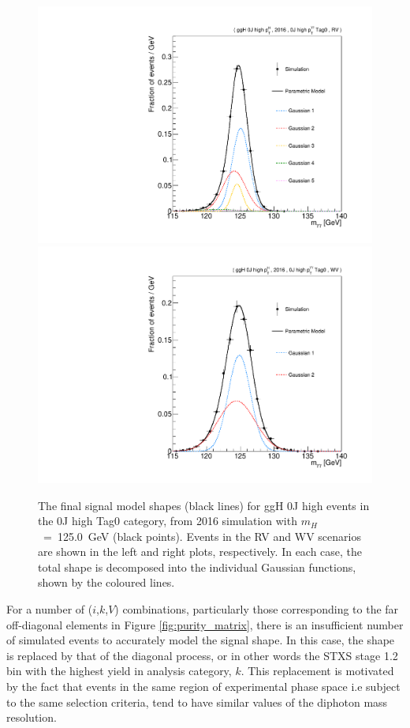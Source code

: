 \begin{figure}
  \centering
  \includegraphics[width=.49\textwidth]{Figures/hgg_stats/RV_shape_pdf_components_GG2H_0J_PTH_GT10_RECO_0J_PTH_GT10_Tag0.pdf}
  \hfill
  \includegraphics[width=.49\textwidth]{Figures/hgg_stats/WV_shape_pdf_components_GG2H_0J_PTH_GT10_RECO_0J_PTH_GT10_Tag0.pdf}
  \caption[Signal modelling: components]
  {
    The final signal model shapes (black lines) for ggH 0J high \ptH events in the 0J high \ptgg Tag0 category, from 2016 simulation with $m_H$~=~125.0~GeV (black points). Events in the RV and WV scenarios are shown in the left and right plots, respectively. In each case, the total shape is decomposed into the individual Gaussian functions, shown by the coloured lines.
  }
  \label{fig:signal_fitting}
\end{figure}

For a number of ($i$,$k$,$V$) combinations, particularly those corresponding to the far off-diagonal elements in Figure \ref{fig:purity_matrix}, there is an insufficient number of simulated events to accurately model the signal shape. In this case, the shape is replaced by that of the diagonal process, or in other words the STXS stage 1.2 bin with the highest yield in analysis category, $k$. This replacement is motivated by the fact that events in the same region of experimental phase space i.e subject to the same selection criteria, tend to have similar values of the diphoton mass resolution.

